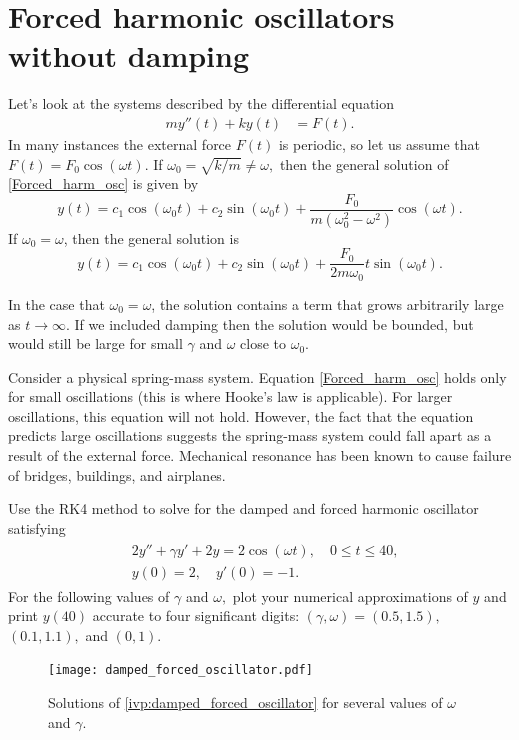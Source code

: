 \section*{Forced harmonic oscillators without damping}
Let's look at the systems described by the differential equation
\begin{align}
my''(t)  + ky(t) &= F(t). \label{Forced_harm_osc}
\end{align}
In many instances the external force $F(t)$ is periodic, so let us assume that $F(t) = F_0 \cos(\omega t)$. 
If $\omega_0 = \sqrt{k/m} \not = \omega,$ then the  general solution of \ref{Forced_harm_osc} is given by
\[y(t) = c_1 \cos (\omega_0 t) + c_2\sin (\omega_0 t) + \frac{F_0}{m(\omega_0^2 - \omega^2)} \cos (\omega t).\]
If $\omega_0 = \omega$, then the general solution is
\[y(t) = c_1 \cos (\omega_0 t) + c_2\sin (\omega_0 t) + \frac{F_0}{2m\omega_0} t \sin (\omega_0 t).\]

In the case that $\omega_0 = \omega$, the solution contains a term that grows arbitrarily large as $t \to \infty$.
If we included damping then the solution would be bounded, but would still be large for small $\gamma$ and $\omega$ close to $\omega_0$.

Consider a physical spring-mass system.
Equation \ref{Forced_harm_osc} holds only for small oscillations (this is where Hooke's law is applicable).
For larger oscillations, this equation will not hold.
However, the fact that the equation predicts large oscillations suggests the spring-mass system could fall apart as a result of the external force. 
Mechanical resonance has been known to cause failure of bridges, buildings, and airplanes.

\begin{problem}
Use the RK4 method to solve for the damped and forced harmonic oscillator satisfying 
\begin{align}
	\begin{split}
&{}2y'' + \gamma y' + 2y = 2 \cos (\omega t), \quad 0 \leq t \leq 40,\\
&{}y(0) = 2, \quad
y'(0) = -1. 
	\end{split}
	\label{ivp:damped_forced_oscillator}
\end{align}
For the following values of $\gamma$ and $\omega,$ plot your numerical approximations of $y$ and print $y(40)$ accurate to four significant digits: $(\gamma, \omega) = (0.5, 1.5),$ $(0.1, 1.1),$ and $(0, 1).$
\end{problem}


\begin{figure}[ht]
\centering
\texttt{[image: damped\_forced\_oscillator.pdf]}
\caption{Solutions of \eqref{ivp:damped_forced_oscillator} for several values of $\omega$ and $\gamma$.}
\label{ivp:damped_forced_oscillator_figure}
\end{figure}
